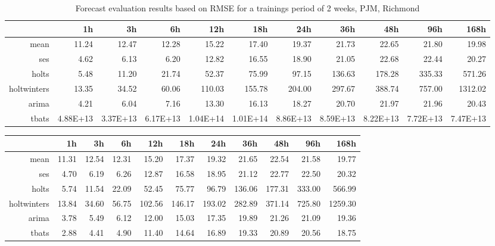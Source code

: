 \begin{landscape}
\begin{table}[ht]
\centering
\vspace*{-0.2in}
\begin{tabular}{rrrrrrrrrrr}
  \hline
 & 1h & 3h & 6h & 12h & 18h & 24h & 36h & 48h & 96h & 168h \\ 
  \hline
mean & 11.24 & 12.47 & 12.28 & 15.22 & 17.40 & 19.37 & 21.73 & 22.65 & 21.80 & 19.98 \\ 
  ses & 4.62 & 6.13 & 6.20 & 12.82 & 16.55 & 18.90 & 21.05 & 22.68 & 22.44 & 20.27 \\ 
  holts & 5.48 & 11.20 & 21.74 & 52.37 & 75.99 & 97.15 & 136.63 & 178.28 & 335.33 & 571.26 \\ 
  holtwinters & 13.35 & 34.52 & 60.06 & 110.03 & 155.78 & 204.00 & 297.67 & 388.74 & 757.00 & 1312.02 \\ 
  arima & 4.21 & 6.04 & 7.16 & 13.30 & 16.13 & 18.27 & 20.70 & 21.97 & 21.96 & 20.43 \\ 
  tbats & 4.88E+13 & 3.37E+13 & 6.17E+13 & 1.04E+14 & 1.01E+14 & 8.86E+13 & 8.59E+13 & 8.22E+13 & 7.72E+13 & 7.47E+13 \\ 
   \hline
\end{tabular}
\caption{Forecast evaluation results based on RMSE for a trainings period of 2 weeks, PJM, Richmond}
\label{tab:app_results_richmond_2weeks}
\end{table}
\begin{table}[ht]
\centering
\vspace*{-0.1in}
\begin{tabular}{rrrrrrrrrrr}
  \hline
 & 1h & 3h & 6h & 12h & 18h & 24h & 36h & 48h & 96h & 168h \\ 
  \hline
mean & 11.31 & 12.54 & 12.31 & 15.20 & 17.37 & 19.32 & 21.65 & 22.54 & 21.58 & 19.77 \\ 
  ses & 4.70 & 6.19 & 6.26 & 12.87 & 16.58 & 18.95 & 21.12 & 22.77 & 22.50 & 20.32 \\ 
  holts & 5.74 & 11.54 & 22.09 & 52.45 & 75.77 & 96.79 & 136.06 & 177.31 & 333.00 & 566.99 \\ 
  holtwinters & 13.84 & 34.60 & 56.75 & 102.56 & 146.17 & 193.02 & 282.89 & 371.14 & 725.80 & 1259.30 \\ 
  arima & 3.78 & 5.49 & 6.12 & 12.00 & 15.03 & 17.35 & 19.89 & 21.26 & 21.09 & 19.36 \\ 
  tbats & 2.88 & 4.41 & 4.90 & 11.40 & 14.64 & 16.89 & 19.33 & 20.89 & 20.56 & 18.75 \\ 

\end{tabular}
\end{table}
\end{landscape}
